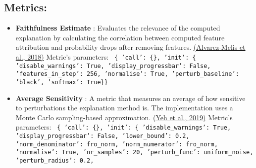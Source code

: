 \documentclass{article}%
\begin{document}
\subsection*{Metrics:}%
\label{subsec:Metrics}%
\begin{itemize}%
\item%
\textbf{Faithfulness Estimate}%
: Evaluates the relevance of the computed explanation by calculating the correlation between computed feature attribution and probability drops after removing features.%
\href{https://arxiv.org/abs/1806.07538}{(Alvarez{-}Melis et al., 2018)}%
\newline%
%
Metric's parameters: \newline%
%
\texttt{%
\{   'call': \{\},\newline%
    'init': \{   'disable\_warnings': True,\newline%
                'display\_progressbar': False,\newline%
                'features\_in\_step': 256,\newline%
                'normalise': True,\newline%
                'perturb\_baseline': 'black',\newline%
                'softmax': True\}\} \newline%
%
}%
\item%
\textbf{Average Sensitivity}%
: A metric that measures an average of how sensitive to perturbations the explanation method is. The implementation uses a Monte Carlo sampling{-}based approximation.%
\href{https://arxiv.org/abs/1901.09392}{(Yeh et al., 2019)}%
\newline%
%
Metric's parameters: \newline%
%
\texttt{%
\{   'call': \{\},\newline%
    'init': \{   'disable\_warnings': True,\newline%
                'display\_progressbar': False,\newline%
                'lower\_bound': 0.2,\newline%
                'norm\_denominator': fro\_norm,\newline%
                'norm\_numerator': fro\_norm,\newline%
                'normalise': True,\newline%
                'nr\_samples': 20,\newline%
                'perturb\_func': uniform\_noise,\newline%
                'perturb\_radius': 0.2,\newline%
}
\end{itemize}
\end{document}
